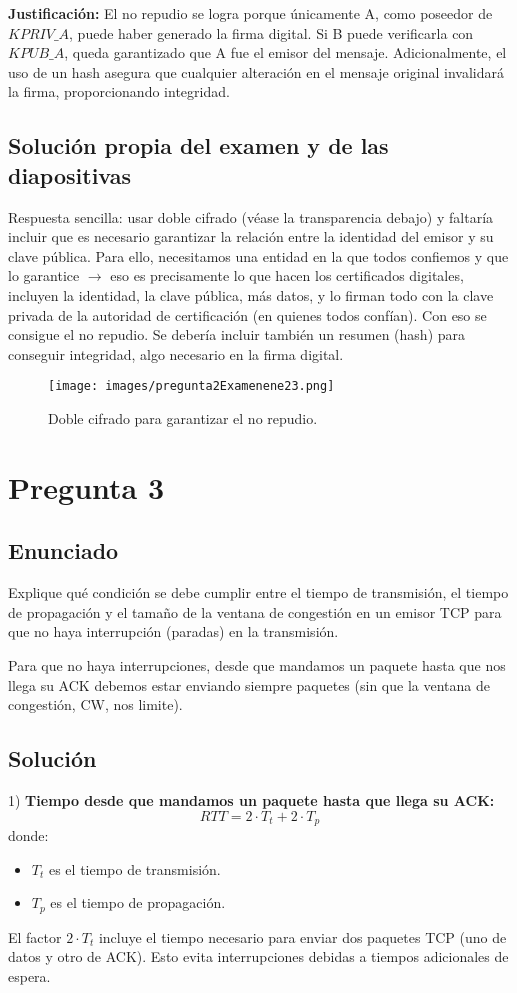 \documentclass[12pt]{article}
\begin{document}
\textbf{Justificación:}
El no repudio se logra porque únicamente A, como poseedor de \( KPRIV\_A \), puede haber generado la firma digital. Si B puede verificarla con \( KPUB\_A \), queda garantizado que A fue el emisor del mensaje. Adicionalmente, el uso de un hash asegura que cualquier alteración en el mensaje original invalidará la firma, proporcionando integridad.

\subsection{Solución propia del examen y de las diapositivas}

Respuesta sencilla: usar doble cifrado (véase la transparencia debajo) y faltaría incluir que es necesario
garantizar la relación entre la identidad del emisor y su clave pública. Para ello, necesitamos una entidad
en la que todos confiemos y que lo garantice $\rightarrow$ eso es precisamente lo que hacen los certificados digitales,
incluyen la identidad, la clave pública, más datos, y lo firman todo con la clave privada de la autoridad de
certificación (en quienes todos confían). Con eso se consigue el no repudio. Se debería incluir también un
resumen (hash) para conseguir integridad, algo necesario en la firma digital.

\begin{figure}[H]
    \centering
    \texttt{[image: images/pregunta2Examenene23.png]}
    \caption{Doble cifrado para garantizar el no repudio.}
\end{figure}



\section{Pregunta 3}

\subsection{Enunciado}
Explique qué condición se debe cumplir entre el tiempo de transmisión, el tiempo de propagación y el tamaño de la ventana de congestión en un emisor TCP para que no haya interrupción (paradas) en la transmisión.  

Para que no haya interrupciones, desde que mandamos un paquete hasta que nos llega su ACK debemos estar enviando siempre paquetes (sin que la ventana de congestión, CW, nos limite).

\subsection{Solución}
1) \textbf{Tiempo desde que mandamos un paquete hasta que llega su ACK:}  
\[ RTT = 2 \cdot T_t + 2 \cdot T_p \]  
donde:  
\begin{itemize}
    \item \( T_t \) es el tiempo de transmisión.
    \item \( T_p \) es el tiempo de propagación.
\end{itemize}  
El factor \( 2 \cdot T_t \) incluye el tiempo necesario para enviar dos paquetes TCP (uno de datos y otro de ACK). Esto evita interrupciones debidas a tiempos adicionales de espera.
\end{document}
